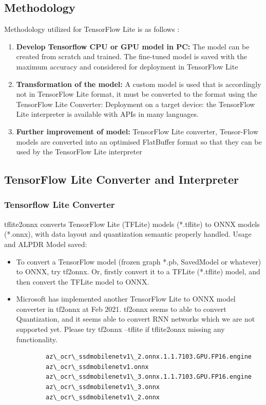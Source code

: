 \subsection{Methodology}
Methodology utilized for TensorFlow Lite is as follows \cite{GoogleTensorFlow:2022}:
\begin{enumerate}
	\item \textbf{Develop Tensorflow CPU or GPU model in PC: }The model can be created from scratch and trained. The fine-tuned model is saved with the maximum accuracy and considered for deployment in TensorFlow Lite
	\item \textbf{Transformation of the model: }A custom model is used that is accordingly not in TensorFlow Lite format, it must be converted to the format using the 
	TensorFlow Lite Converter: Deployment on a target device: the TensorFlow Lite interpreter is available with APIs in many languages.
	\item \textbf{Further improvement of model: }TensorFlow Lite converter, Tensor-Flow models are converted into an optimised FlatBuffer format so that they can be used by the TensorFlow Lite interpreter
\end{enumerate}
\subsection{TensorFlow Lite Converter and Interpreter}
\subsubsection{Tensorflow Lite Converter}

tflite2onnx converts TensorFlow Lite (TFLite) models (*.tflite) to ONNX models (*.onnx), with data layout and quantization semantic properly handled.
Usage and ALPDR Model saved:
\begin{itemize}
	\item To convert a TensorFlow model (frozen graph *.pb, SavedModel or whatever) to ONNX, try tf2onnx. Or, firstly convert it to a TFLite (*.tflite) model, and then convert the TFLite model to ONNX.
	\item Microsoft has implemented another TensorFlow Lite to ONNX model converter in tf2onnx at Feb 2021. tf2onnx seems to able to convert Quantization, and it seems able to convert RNN networks which we are not supported yet. Please try tf2onnx --tflite if tflite2onnx missing any functionality.
	\begin{lstlisting}
		az\_ocr\_ssdmobilenetv1\_2.onnx.1.1.7103.GPU.FP16.engine
		az\_ocr\_ssdmobilenetv1.onnx
		az\_ocr\_ssdmobilenetv1\_3.onnx.1.1.7103.GPU.FP16.engine
		az\_ocr\_ssdmobilenetv1\_3.onnx
		az\_ocr\_ssdmobilenetv1\_2.onnx
	\end{lstlisting}
\end{itemize}


